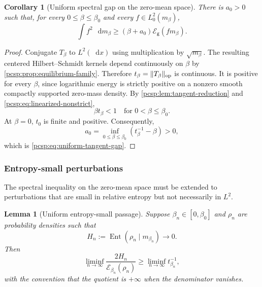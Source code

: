 \documentclass[11pt,reqno]{amsart}
\numberwithin{equation}{section}
\theoremstyle{plain}
\newtheorem{lemma}[lemma]{Lemma}
\newtheorem{cor}[cor]{Corollary}
\theoremstyle{definition}
\DeclarePairedDelimiter{\norm}{\lVert}{\rVert}
\newcommand{\dd}{\mathop{}\!\mathrm d}
\newcommand{\op}{\mathrm{op}}
\newcommand{\be}{\beta}
\newcommand{\g}{\mathsf g}
\newcommand{\Ent}{\operatorname{Ent}}
\newcommand{\Ecal}{\mathcal E}
\begin{document}
\begin{cor}[Uniform spectral gap on the zero-mean space]\label{pcsp:cor:tangent-gap}
There is $a_0>0$ such that, for every $0\leq\be\leq\be_0$ and every $f\in L_0^2(m_\be)$,
\begin{equation}\label{pcsp:eq:uniform-tangent-gap}
 \int f^2\,\dd m_\be
 \geq(\be+a_0)\Ecal_\g(fm_\be).
\end{equation}
\end{cor}

\begin{proof}
Conjugate $T_\be$ to $L^2(\dd x)$ using multiplication by $\sqrt{m_\be}$.  The resulting centered Hilbert--Schmidt kernels depend continuously on $\be$ by \cref{pcsp:prop:equilibrium-family}.  Therefore $t_\be=\norm{T_\be}_{\op}$ is continuous.  It is positive for every $\be$, since logarithmic energy is strictly positive on a nonzero smooth compactly supported zero-mass density.  By \cref{pcsp:lem:tangent-reduction} and \eqref{pcsp:eq:linearized-nonstrict},
\begin{equation}\label{pcsp:eq:strict-operator-norm}
 \be t_\be<1
 \quad\text{for }0<\be\leq\be_0.
\end{equation}
At $\be=0$, $t_0$ is finite and positive.  Consequently,
\begin{equation}\label{pcsp:eq:a0-definition}
 a_0=\inf_{0\leq\be\leq\be_0}\left(t_\be^{-1}-\be\right)>0,
\end{equation}
which is \eqref{pcsp:eq:uniform-tangent-gap}.
\end{proof}

\subsubsection{Entropy-small perturbations}

The spectral inequality on the zero-mean space must be extended to perturbations that are small in relative entropy but not necessarily in $L^2$.

\begin{lemma}[Uniform entropy-small passage]\label{pcsp:lem:entropy-small}
Suppose $\be_n\in[0,\be_0]$ and $\rho_n$ are probability densities such that
\begin{equation}\label{pcsp:eq:entropy-small-assumption}
 H_n:=\Ent(\rho_n\mid m_{\be_n})\longrightarrow0.
\end{equation}
Then
\begin{equation}\label{pcsp:eq:entropy-small-conclusion}
 \liminf_{n\to\infty}
 \frac{2H_n}{\Ecal_{\be_n}(\rho_n)}
 \geq
 \liminf_{n\to\infty}t_{\be_n}^{-1},
\end{equation}
with the convention that the quotient is $+\infty$ when the denominator vanishes.
\end{lemma}
\end{document}
